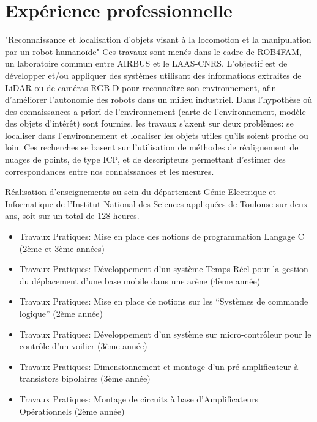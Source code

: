 \documentclass[11pt,a4paper,sans]{moderncv}        %
\begin{document}
\section{Exp\'erience professionnelle}
{"Reconnaissance et localisation d'objets visant \`a la locomotion et la manipulation par un robot humano\"ide"}
{Ces travaux sont men\'es dans le cadre de ROB4FAM, un laboratoire commun entre AIRBUS et le LAAS-CNRS. L'objectif est de d\'evelopper et/ou appliquer des syst\`emes utilisant des informations extraites de LiDAR ou de cam\'eras RGB-D pour reconna\^itre son environnement, afin d'am\'eliorer l'autonomie des robots dans un milieu industriel. Dans l'hypoth\`ese o\`u des connaissances a priori de l'environnement (carte de l'environnement, mod\`ele des objets d'int\'er\^et) sont fournies, les travaux s'axent sur deux probl\`emes: se localiser dans l'environnement et localiser les objets utiles qu'ils soient proche ou loin. Ces recherches se basent sur l'utilisation de m\'ethodes de r\'ealignement de nuages de points, de type ICP, et de descripteurs permettant d'estimer des correspondances entre nos connaissances et les mesures.
}
%
{}{
  R\'ealisation d'enseignements au sein du d\'epartement G\'enie Electrique et Informatique de l'Institut National des Sciences appliqu\'ees de Toulouse sur deux ans, soit sur un total de 128 heures.
  \begin{itemize}
    \item Travaux Pratiques: Mise en place des notions de programmation Langage C (2\`eme et 3\`eme ann\'ees)
    \item Travaux Pratiques: D\'eveloppement d'un syst\`eme Temps R\'eel pour la gestion du d\'eplacement d'une base mobile dans une ar\`ene (4\`eme ann\'ee)
    \item Travaux Pratiques: Mise en place de notions sur les ``Syst\`emes de commande logique'' (2\`eme ann\'ee)
    \item Travaux Pratiques: D\'eveloppement d'un syst\`eme sur micro-contr\^oleur pour le contr\^ole d'un voilier (3\`eme ann\'ee)
    \item Travaux Pratiques: Dimensionnement et montage d'un pr\'e-amplificateur \`a transistors bipolaires (3\`eme ann\'ee)
    \item Travaux Pratiques: Montage de circuits \`a base d'Amplificateurs Op\'erationnels (2\`eme ann\'ee)
  \end{itemize}
}
\end{document}
